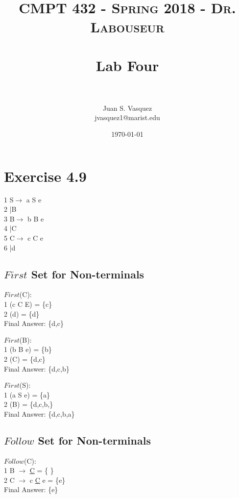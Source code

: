 \documentclass[letterpaper, 10pt,DIV=13]{scrartcl}
\title{	
   \normalfont \normalsize 
   \textsc{CMPT 432 - Spring 2018 - Dr. Labouseur} \\[10pt] %
   \horrule{0.5pt} \\[0.25cm] 	%
   \huge Lab Four \\     	    %
   \horrule{0.5pt} \\[0.25cm] 	%
}
\author{Juan S. Vasquez \\ \normalsize jvasquez1@marist.edu}
\date{\normalsize\today} 	%
\numberwithin{equation}{section} %
\numberwithin{figure}{section} %
\numberwithin{table}{section} %
\begin{document}
\maketitle %

\section{Exercise 4.9}

1 S\hspace{0.3cm}$\rightarrow$ a S e   \\
2  \hspace{0.5cm}   |\hspace{0.2cm}B       \\
3 B\hspace{0.28cm}$\rightarrow$ b B e  \\
4  \hspace{0.5cm}   |\hspace{0.2cm}C       \\
5 C\hspace{0.28cm}$\rightarrow$ c C e  \\
6  \hspace{0.5cm}   |\hspace{0.2cm}d

\subsection{$First$ Set for Non-terminals}
$First$(C): \\
1 (c C E) = \{c\} \\
2 (d) = \{d\} \\
Final Answer: \{d,c\}

$First$(B): \\
1 (b B e) = \{b\} \\
2 (C) = \{d,c\} \\
Final Answer: \{d,c,b\}

$First$(S): \\
1 (a S e) = \{a\} \\
2 (B) = \{d,c,b,\} \\
Final Answer: \{d,c,b,a\}

\pagebreak

\subsection{$Follow$ Set for Non-terminals}
$Follow$(C): \\
1 B $\rightarrow$ \underline{C} = \{ \}\\
2 C $\rightarrow$ c \underline{C} e = \{e\}\\
Final Answer: \{e\}
\end{document}
